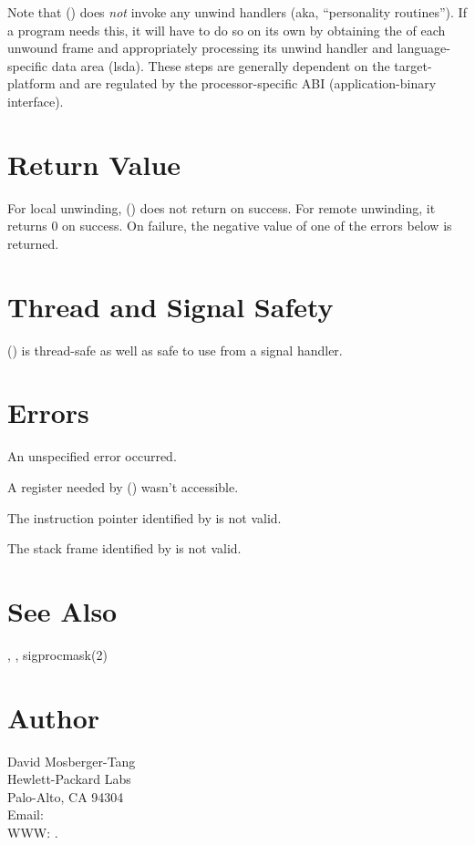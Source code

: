 \documentclass{article}
\begin{document}
Note that () does \emph{not} invoke any unwind
handlers (aka, ``personality routines'').  If a program needs this, it
will have to do so on its own by obtaining the 
of each unwound frame and appropriately processing its unwind handler
and language-specific data area (lsda).  These steps are generally
dependent on the target-platform and are regulated by the
processor-specific ABI (application-binary interface).

\section{Return Value}

For local unwinding, () does not return on success.
For remote unwinding, it returns 0 on success.  On failure, the
negative value of one of the errors below is returned.

\section{Thread and Signal Safety}

() is thread-safe as well as safe to use from a
signal handler.

\section{Errors}

\begin{Description}
\item[\Const{UNW\_EUNSPEC}] An unspecified error occurred.
\item[\Const{UNW\_EBADREG}] A register needed by () wasn't
  accessible.
\item[\Const{UNW\_EINVALIDIP}] The instruction pointer identified by
   is not valid.
\item[\Const{UNW\_BADFRAME}] The stack frame identified by
   is not valid.
\end{Description}

\section{See Also}

,
,
sigprocmask(2)

\section{Author}

\noindent
David Mosberger-Tang\\
Hewlett-Packard Labs\\
Palo-Alto, CA 94304\\
Email: \\
WWW: .
\LatexManEnd
\end{document}
